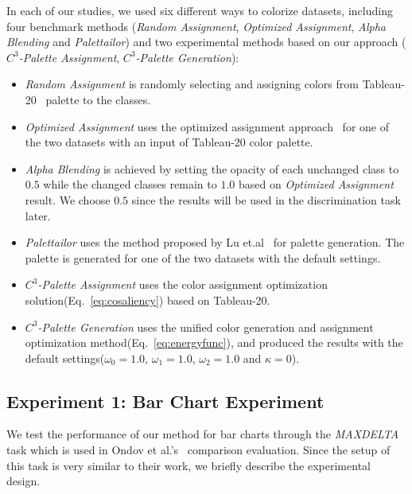 \vspace{.3em}
 In each of our studies, we used six different ways to colorize datasets, including four benchmark methods (\emph{Random Assignment}, \emph{Optimized Assignment}, \emph{Alpha Blending} and \emph{Palettailor}) and two experimental methods based on our approach (\emph{$C^3$-Palette Assignment}, \emph{$C^3$-Palette Generation}):
\begin{itemize}
     \item \emph{Random Assignment} is randomly selecting and assigning colors from Tableau-20~\cite{tableau} palette to the classes.
     \item \emph{Optimized Assignment} uses the optimized assignment approach~\cite{Wang2018} for one of the two datasets with an input of Tableau-20 color palette.
     \item \emph{Alpha Blending} is achieved by setting the opacity of each unchanged class to $0.5$ while the changed classes remain to $1.0$ based on \emph{Optimized Assignment} result. We choose $0.5$ since the results will be used in the discrimination task later.
     \item \emph{Palettailor} uses the method proposed by Lu et.al~\cite{Lu21} for palette generation. The palette is generated for one of the two datasets with the default settings.
     \item \emph{$C^3$-Palette Assignment} uses the color assignment optimization solution(Eq.~\ref{eq:cosaliency}) based on Tableau-20.
     \item \emph{$C^3$-Palette Generation} uses the unified color generation and assignment optimization method(Eq.~\ref{eq:energyfunc}), and produced the results with the default settings($\omega_0=1.0$, $\omega_1=1.0$, $\omega_2=1.0$ and $\kappa=0$).
\end{itemize}

\subsection{Experiment 1: Bar Chart Experiment}
\label{subsec:barchartExp}
We test the performance of our method for bar charts through the \emph{MAXDELTA} task which is used in Ondov et al.'s~\cite{Ondov19} comparison evaluation. Since the setup of this task is very similar to their work, we briefly describe the experimental design.


